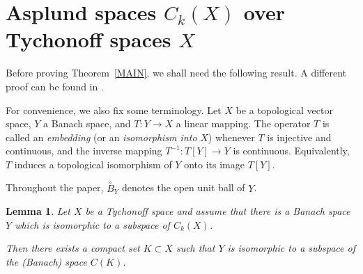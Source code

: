 \documentclass[12pt]{amsart}
\theoremstyle{plain}
\newtheorem{lemma}[theorem]{Lemma}
\theoremstyle{definition}
\theoremstyle{remark}
\begin{document}
\section{Asplund spaces $C_k(X)$ over Tychonoff spaces $X$}
Before proving Theorem~\ref{MAIN}, we shall need the following result. A different proof can be found in \cite[Proposition~3.13]{KL1}.

For convenience, we also fix some terminology. Let $X$ be a topological vector space, $Y$ a Banach space, and $T:Y\to X$ a linear mapping. The operator $T$ is called an {\it embedding} (or an {\it isomorphism into} $X$) whenever $T$ is injective and continuous, and the inverse mapping
$T^{-1}:T[Y]\to Y$ is continuous. Equivalently, $T$ induces a topological isomorphism of $Y$ onto its image $T[Y]$.

Throughout the paper, $\stackrel{\circ}{B}_Y$ denotes the open unit ball of $Y$.
\begin{lemma}\label{ku} Let $X$ be a Tychonoff space and assume that there is a Banach space $Y$ which is isomorphic to a subspace of $C_k(X)$.

\noindent Then there exists a compact set $K\subset X$ such that $Y$ is isomorphic to a subspace of the (Banach) space $C(K)$.
\end{lemma}
\end{document}

